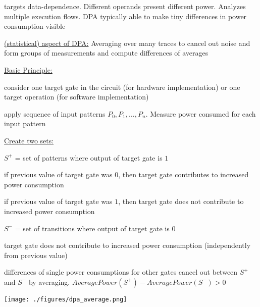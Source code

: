 \documentclass[landscape, a4paper]{article}
\begin{document}
\begin{minipage}[t]{0.2\linewidth}
\begin{betterlist}
		\begin{betterlist}
			\item targets data-dependence. Different operands present different power. Analyzes multiple execution flows. DPA typically able to make tiny differences in power consumption visible
			\item \underline{(statistical) aspect of DPA:} \alert{Averaging} over many traces to cancel out noise and \alert{form groups of measurements} and compute differences of averages
			\item \underline{Basic Principle:}
			\begin{betterlist}
				\item consider one target gate in the circuit (for hardware implementation) or one target operation (for software implementation)
				\item apply sequence of input patterns $P_0, P_1, \ldots, P_n$. Measure power consumed for each input pattern
				\item \underline{Create two sets:}
				\begin{betterlist}
					\item $S^+$ = set of patterns where output of target gate is $1$
					\begin{betterlist}
						\item if previous value of target gate was $0$, then target gate contributes to increased power consumption
						\item if previous value of target gate was $1$, then target gate does not contribute to increased power consumption
					\end{betterlist}
					\item $S^−$ = set of transitions where output of target gate is $0$
					\begin{betterlist}
						\item target gate does not contribute to increased power consumption (independently from previous value)
					\end{betterlist}
				\end{betterlist}
				\item differences of single power consumptions for other gates cancel out between $S^+$ and $S^−$ by averaging. $AveragePower(S^+) - AveragePower(S^−) > 0$
			\end{betterlist}
			\texttt{[image: ./figures/dpa\_average.png]}


\end{betterlist}
\end{betterlist}
\end{minipage}
\end{document}
